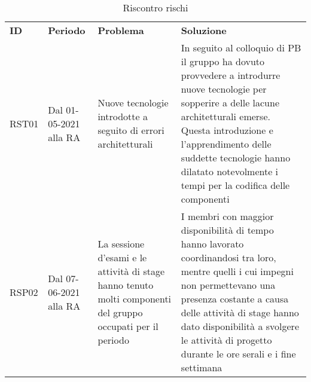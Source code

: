 \newpage

\begin{table} [!ht]
	\begin{center}
		\begin{tabular} { m{1cm} m{3cm} m{5cm} m{6cm} }
			\rowcolor{lightgray}
			\textbf{ID} & \textbf{Periodo} & \textbf{Problema} & \textbf{Soluzione}\\
			
			RST01 & Dal 01-05-2021 alla RA & Nuove tecnologie introdotte a seguito di errori architetturali & In seguito al colloquio di PB il gruppo ha dovuto provvedere a introdurre nuove tecnologie per sopperire a delle lacune architetturali emerse. Questa introduzione e l'apprendimento delle suddette tecnologie hanno dilatato notevolmente i tempi per la codifica delle componenti \\	
			
			RSP02 & Dal 07-06-2021 alla RA & La sessione d'esami e le attività di stage hanno tenuto molti componenti del gruppo occupati per il periodo & I membri con maggior disponibilità di tempo hanno lavorato coordinandosi tra loro, mentre quelli i cui impegni non permettevano una presenza costante a causa delle attività di stage hanno dato disponibilità a svolgere le attività di progetto durante le ore serali e i fine settimana \\	
					
		\end{tabular}
	\end{center}
\caption{Riscontro rischi}
\end{table}

	

\newpage